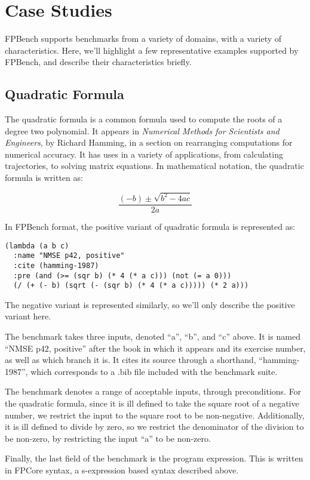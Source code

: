 \documentclass[main.tex]{subfiles}
\begin{document}
\section{Case Studies}

FPBench supports benchmarks from a variety of domains, with a variety
of characteristics. Here, we'll highlight a few representative
examples supported by FPBench, and describe their characteristics
briefly.

\subsection{Quadratic Formula}

The quadratic formula is a common formula used to compute the roots of
a degree two polynomial. It appears in \textit{Numerical Methods for
  Scientists and Engineers}, by Richard Hamming, in a section on
rearranging computations for numerical accuracy. It has uses in a
variety of applications, from calculating trajectories, to solving
matrix equations. In mathematical notation, the quadratic formula is
written as:

\begin{equation}
  \frac{(- b) \pm \sqrt{b^2 - 4ac}}{2a}
\end{equation}

In FPBench format, the positive variant of quadratic formula is
represented as:

\begin{verbatim}
(lambda (a b c)
  :name "NMSE p42, positive"
  :cite (hamming-1987)
  :pre (and (>= (sqr b) (* 4 (* a c))) (not (= a 0)))
  (/ (+ (- b) (sqrt (- (sqr b) (* 4 (* a c))))) (* 2 a)))
\end{verbatim}

The negative variant is represented similarly, so we'll only describe
the positive variant here.

The benchmark takes three inputs, denoted ``a'', ``b'', and ``c''
above. It is named ``NMSE p42, positive'' after the book in which it
appears and its exercise number, as well as which branch it is. It
cites its source through a shorthand, ``hamming-1987'', which
corresponds to a .bib file included with the benchmark suite.

The benchmark denotes a range of acceptable inputs, through
preconditions. For the quadratic formula, since it is ill defined to
take the square root of a negative number, we restrict the input to
the square root to be non-negative. Additionally, it is ill defined to
divide by zero, so we restrict the denominator of the division to be
non-zero, by restricting the input ``a'' to be non-zero.

Finally, the last field of the benchmark is the program
expression. This is written in FPCore syntax, a s-expression based
syntax described above.
\end{document}
